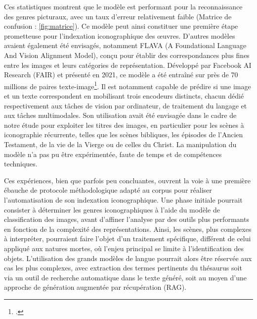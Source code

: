 Ces statistiques montrent que le modèle est performant pour la reconnaissance des genres picturaux, avec un taux d’erreur relativement faible (Matrice de confusion : \ref{fig:matrice}). Ce modèle peut ainsi constituer une première étape prometteuse pour l’indexation iconographique des œuvres.
D’autres modèles avaient également été envisagés, notamment FLAVA (A Foundational Language And Vision Alignment Model), conçu pour établir des correspondances plus fines entre les images et leurs catégories de représentation. Développé par Facebook AI Research (FAIR) et présenté en 2021, ce modèle a été entraîné sur près de 70 millions de paires texte-image\footcite{singhFLAVAFoundationalLanguage2021}. Il est notamment capable de prédire si une image et un texte correspondent en mobilisant trois encodeurs distincts, chacun dédié respectivement aux tâches de vision par ordinateur, de traitement du langage et aux tâches multimodales. Son utilisation avait été envisagée dans le cadre de notre étude pour exploiter les titres des images, en particulier pour les scènes à iconographie récurrente, telles que les scènes bibliques, les épisodes de l’Ancien Testament, de la vie de la Vierge ou de celles du Christ. La manipulation du modèle n’a pas pu être expérimentée, faute de temps et de compétences techniques.

Ces expériences, bien que parfois peu concluantes, ouvrent la voie à une première ébauche de protocole méthodologique adapté au corpus pour réaliser l’automatisation de son indexation iconographique. Une phase initiale pourrait consister à déterminer les genres iconographiques à l’aide du modèle de classification des images, avant d’affiner l’analyse par des outils plus performants en fonction de la complexité des représentations. Ainsi, les scènes, plus complexes à interpréter, pourraient faire l’objet d’un traitement spécifique, différent de celui appliqué aux natures mortes, où l’enjeu principal se limite à l’identification des objets. L’utilisation des grands modèles de langue pourrait alors être réservée aux cas les plus complexes, avec extraction des termes pertinents du thésaurus soit via un outil de recherche automatique dans le texte généré, soit au moyen d’une approche de génération augmentée par récupération (RAG).

